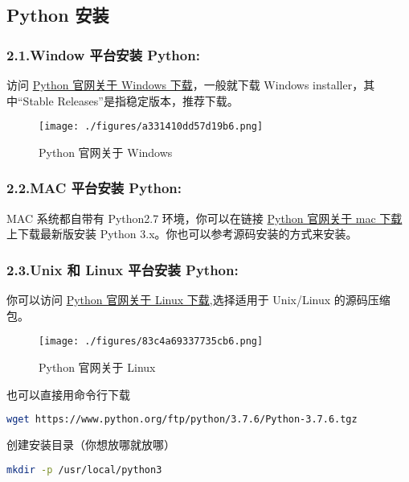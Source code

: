 
\subsection{Python 安装} 

\subsubsection{2.1.Window 平台安装 Python:}
访问 \href{https://www.python.org/downloads/windows/}{Python 官网关于 Windows 下载}，一般就下载  Windows installer，其中“Stable Releases”是指稳定版本，推荐下载。
\begin{figure}[ht]
\centering
\texttt{[image: ./figures/a331410dd57d19b6.png]}
\caption{Python 官网关于 Windows} \label{fig_Python_1}
\end{figure}

\subsubsection{2.2.MAC 平台安装 Python:}
MAC 系统都自带有 Python2.7 环境，你可以在链接 \href{https://www.python.org/downloads/mac-osx/}{Python 官网关于 mac 下载} 上下载最新版安装 Python 3.x。你也可以参考源码安装的方式来安装。

\subsubsection{2.3.Unix 和 Linux 平台安装 Python:}
你可以访问 \href{https://www.python.org/downloads/source/}{Python 官网关于 Linux 下载},选择适用于 Unix/Linux 的源码压缩包。
\begin{figure}[ht]
\centering
\texttt{[image: ./figures/83c4a69337735cb6.png]}
\caption{Python 官网关于 Linux} \label{fig_Python_2}
\end{figure}

也可以直接用命令行下载
\begin{lstlisting}[language=bash]
wget https://www.python.org/ftp/python/3.7.6/Python-3.7.6.tgz
\end{lstlisting}

创建安装目录（你想放哪就放哪）
\begin{lstlisting}[language=bash]
mkdir -p /usr/local/python3
\end{lstlisting}

